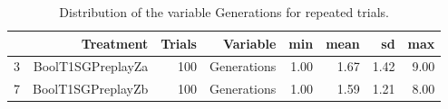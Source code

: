 \begin{table}[ht]
\centering
\begin{tabular}{rrrrrrrr}
  \hline
 & Treatment & Trials & Variable & min & mean & sd & max \\ 
  \hline
3 & BoolT1SGPreplayZa & 100 & Generations & 1.00 & 1.67 & 1.42 & 9.00 \\ 
  7 & BoolT1SGPreplayZb & 100 & Generations & 1.00 & 1.59 & 1.21 & 8.00 \\ 
   \hline
\end{tabular}
\caption{Distribution of the variable Generations for repeated trials.} 
\end{table}
